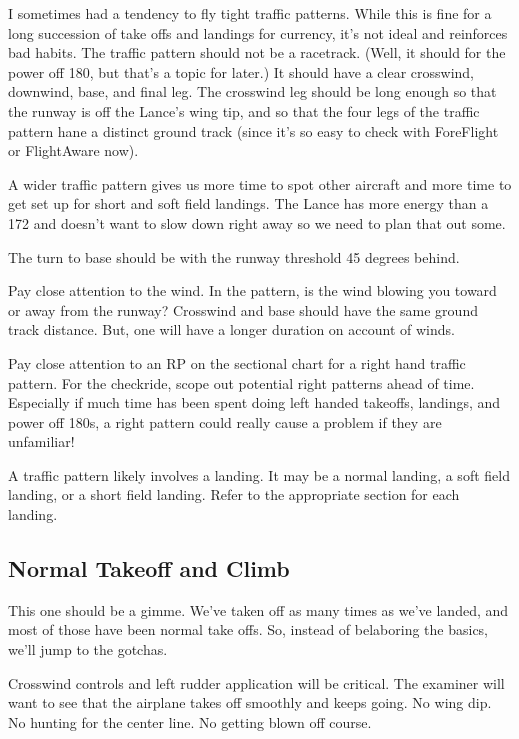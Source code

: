 I sometimes had a tendency to fly tight traffic patterns. While this is fine for a long succession of take offs and landings for currency, it's not ideal and reinforces bad habits. The traffic pattern should not be a racetrack. (Well, it should for the power off 180, but that's a topic for later.) It should have a clear crosswind, downwind, base, and final leg. The crosswind leg should be long enough so that the runway is off the Lance's wing tip, and so that the four legs of the traffic pattern hane a distinct ground track (since it's so easy to check with ForeFlight or FlightAware now).

A wider traffic pattern gives us more time to spot other aircraft and more time to get set up for short and soft field landings. The Lance has more energy than a 172 and doesn't want to slow down right away so we need to plan that out some.

The turn to base should be with the runway threshold 45 degrees behind.

Pay close attention to the wind. In the pattern, is the wind blowing you toward or away from the runway? Crosswind and base should have the same ground track distance. But, one will have a longer duration on account of winds.

Pay close attention to an RP on the sectional chart for a right hand traffic pattern. For the checkride, scope out potential right patterns ahead of time. Especially if much time has been spent doing left handed takeoffs, landings, and power off 180s, a right pattern could really cause a problem if they are unfamiliar!

A traffic pattern likely involves a landing. It may be a normal landing, a soft field landing, or a short field landing. Refer to the appropriate section for each landing.

\subsection{Normal Takeoff and Climb}

This one should be a gimme. We've taken off as many times as we've landed, and most of those have been normal take offs. So, instead of belaboring the basics, we'll jump to the gotchas.

Crosswind controls and left rudder application will be critical. The examiner will want to see that the airplane takes off smoothly and keeps going. No wing dip. No hunting for the center line. No getting blown off course.

